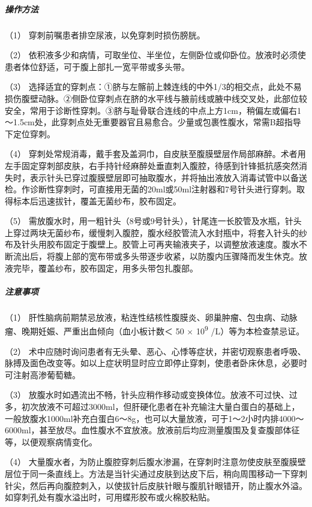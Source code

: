 \subparagraph{操作方法}

（1） 穿刺前嘱患者排空尿液，以免穿刺时损伤膀胱。

（2）
依积液多少和病情，可取坐位、半坐位，左侧卧位或仰卧位。放液时必须使患者体位舒适，可于腹上部扎一宽平带或多头带。

（3）
选择适宜的穿刺点：①脐与左髂前上棘连线的中外1/3的相交点，此处不易损伤腹壁动脉。②侧卧位穿刺点在脐的水平线与腋前线或腋中线交叉处，此部位较安全，常用于诊断性穿刺。③脐与耻骨联合连线的中点上方1cm，稍偏左或偏右1～1.5cm处，此穿刺点处无重要器官且易愈合。少量或包裹性腹水，常需B超指导下定位穿刺。

（4）
穿刺处常规消毒，戴手套及盖洞巾，自皮肤至腹膜壁层作局部麻醉。术者用左手固定穿刺部皮肤，右手持针经麻醉处垂直刺入腹腔，待感到针锋抵抗感突然消失时，表示针头已穿过腹膜壁层即可抽取腹水，并将抽出液放入消毒试管中以备送检。作诊断性穿刺时，可直接用无菌的20ml或50ml注射器和7号针头进行穿刺。取得标本后迅速拔针，覆盖无菌纱布，胶布固定。

（5）
需放腹水时，用一粗针头（8号或9号针头），针尾连一长胶管及水瓶，针头上穿过两块无菌纱布，缓慢刺入腹腔，腹水经胶管流入水封瓶中，将套入针头的纱布及针头用胶布固定于腹壁上。胶管上可再夹输液夹子，以调整放液速度。腹水不断流出后，将腹上部的宽布带或多头带逐步收紧，以防腹内压骤降而发生休克。放液完毕，覆盖纱布，胶布固定，用多头带包扎腹部。

\subparagraph{注意事项}

（1）
肝性脑病前期禁忌放液，粘连性结核性腹膜炎、卵巢肿瘤、包虫病、动脉瘤、晚期妊娠、严重出血倾向（血小板计数＜
50 × 10\textsuperscript{9} /L）等为本检查禁忌证。

（2）
术中应随时询问患者有无头晕、恶心、心悸等症状，并密切观察患者呼吸、脉搏及面色改变等。如以上症状明显时应立即停止穿刺，使患者卧床休息，必要时可注射高渗葡萄糖。

（3）
放腹水时如遇流出不畅，针头应稍作移动或变换体位。放液不可过快、过多，初次放液不可超过3000ml，但肝硬化患者在补充输注大量白蛋白的基础上，一般放腹水1000ml补充白蛋白6～8g，也可以大量放液，可于1～2小时内排4000～6000ml，甚至放尽。血性腹水不宜放液。放液前后均应测量腹围及复查腹部体征等，以便观察病情变化。

（4）
大量腹水者，为防止腹腔穿刺后腹水渗漏，在穿刺时注意勿使皮肤至腹膜壁层位于同一条直线上。方法是当针尖通过皮肤到达皮下后，稍向周围移动一下穿刺针尖，然后再向腹腔刺入，以使拔针后皮肤针眼与腹肌针眼错开，防止腹水外溢。如穿刺孔处有腹水溢出时，可用蝶形胶布或火棉胶粘贴。

\protect\hypertarget{text00381.html}{}{}

